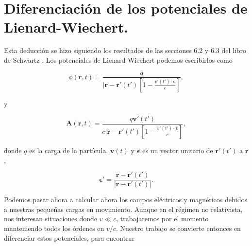 \documentclass[a4paper,11pt]{article}
\numberwithin{equation}{section}
\renewcommand{\thefootnote}{\fnsymbol{footnote}}
\begin{document}

\fancyhead[R]{\thepage}

\setcounter{footnote}{0}
\renewcommand*{\thefootnote}{\arabic{footnote}}


\section{Diferenciación de los potenciales de Lienard-Wiechert.}

Esta deducción se hizo siguiendo los resultados de las secciones 6.2 y 6.3 del 
libro de Schwartz \cite{schwartz}. Los potenciales de Lienard-Wiechert podemos 
escribirlos como 

\begin{equation}
 \phi(\mathbf{r},t) = \frac{q}{|\mathbf{r}-\mathbf{r}'(t')\left[1 - 
 \frac{v'(t')\cdot \hat{\mathbf{\epsilon}}}{c}\right]},
\end{equation}

y 

\begin{equation}
 \mathbf{A}(\mathbf{r},t) = \frac{q\mathbf{v}'(t')}{c|\mathbf{r}-\mathbf{r}'(t')\left[1 - 
 \frac{v'(t')\cdot \hat{\mathbf{\epsilon}}}{c}\right]},
\end{equation}

donde $q$ es la carga de la partícula, $\mathbf{v}(t)$ y $\mathbf{\epsilon}$ 
es un vector unitario de $\mathbf{r}'(t')$ a $\mathbf{r}$, 

\begin{equation}
 \mathbf{\epsilon}' = \frac{\mathbf{r}-\mathbf{r}'(t')}{|\mathbf{r}-\mathbf{r}'(t')|}.
\end{equation}

Podemos pasar ahora a calcular ahora los campos eléctricos y magnéticos debidos a 
nuestras pequeñas cargas en movimiento. Aunque en el régimen no relativista, nos 
interesan situaciones donde $v \ll c$, trabajaremos por el momento manteniendo 
todos los órdenes en $v/c$. Nuestro trabajo se convierte entonces en diferenciar 
estos potenciales, para encontrar 
\end{document}
